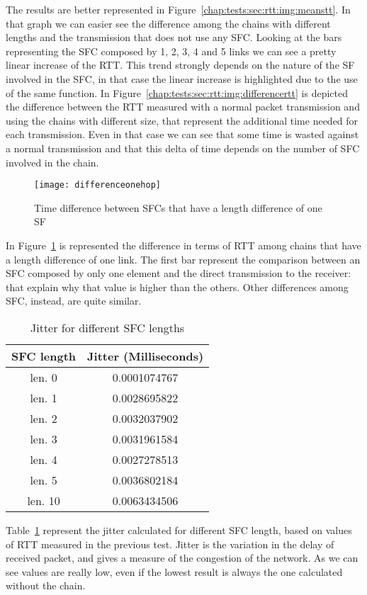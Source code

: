 The results are better represented in
Figure~\ref{chap:tests:sec:rtt:img:meanstt}. In that graph we can easier see
the difference among the chains with different lengths and the transmission that
does not use any SFC. Looking at the bars representing the SFC composed by 1,
2, 3, 4 and 5 links we can see a pretty linear increase of the RTT. This trend
strongly depends on the nature of the SF involved in the SFC, in that case the
linear increase is highlighted due to the use of the same function. In
Figure~\ref{chap:tests:sec:rtt:img:differencertt} is depicted the difference
between the RTT measured with a normal packet transmission and using the chains
with different size, that represent the additional time needed for each
transmission. Even in that case we can see that some time is wasted against a
normal transmission and that this delta of time depends on the number of SFC
involved in the chain.

\begin{figure}
  \centering
  \texttt{[image: differenceonehop]}
  \caption{Time difference between SFCs that have a length difference of one SF}
  \label{chap:tests:sec:rtt:img:differenceonehop}
\end{figure}

In Figure~\ref{chap:tests:sec:rtt:img:differenceonehop} is represented the
difference in terms of RTT among chains that have a length difference of one
link. The first bar represent the comparison between an SFC composed by only
one element and the direct transmission to the receiver: that explain why that
value is higher than the others. Other differences among SFC, instead, are
quite similar.

\begin{table}[]
\centering
\begin{tabular}{@{}cc@{}}
\toprule
\textbf{SFC length} & \textbf{Jitter (Milliseconds)} \\ \midrule
len. 0              & 0.0001074767    \\
len. 1              & 0.0028695822    \\
len. 2              & 0.0032037902    \\
len. 3              & 0.0031961584    \\
len. 4              & 0.0027278513    \\
len. 5              & 0.0036802184    \\
len. 10             & 0.0063434506    \\ \bottomrule
\end{tabular}
\caption{Jitter for different SFC lengths}
\label{chap:tests:sec:rtt:tab:jitter}
\end{table}

Table~\ref{chap:tests:sec:rtt:tab:jitter} represent the jitter calculated for
different SFC length, based on values of RTT measured in the previous test.
Jitter is the variation in the delay of received packet, and gives a measure of
the congestion of the network. As we can see values are really low, even if the
lowest result is always the one calculated without the chain.